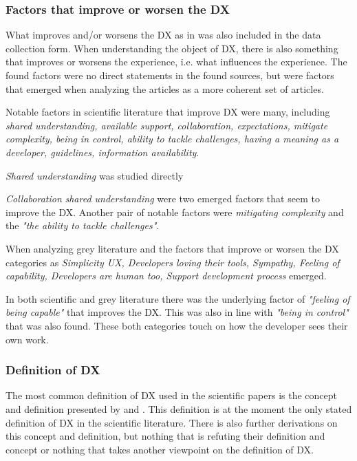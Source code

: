 \documentclass[english, 12pt, a4paper, sci, utf8, a-1b, online]{aaltothesis}
\newcounter{subsubsubsection}[subsubsection]
\begin{document}
\subsubsection{Factors that improve or worsen the DX}

What improves and/or worsens the DX as in \citet{fagerholm-doctoral-thesis} was also included in the data collection form. When understanding the object of DX, there is also something that improves or worsens the experience, i.e. what influences the experience. The found factors were no direct statements in the found sources, but were factors that emerged when analyzing the articles as a more coherent set of articles.


Notable factors in scientific literature that improve DX were many, including \textit{shared understanding,	available support, collaboration, expectations, mitigate complexity, being in control, ability to tackle challenges, having a meaning as a developer, guidelines, information availability}.

\textit{Shared understanding} was studied directly

\textit{Collaboration} \textit{shared understanding} were two emerged factors that seem to improve the DX. Another pair of notable factors were \textit{mitigating complexity} and the \textit{"the ability to tackle challenges"}.


When analyzing grey literature and the factors that improve or worsen the DX categories as \textit{Simplicity	UX, Developers loving their tools, Sympathy, Feeling of capability, Developers are human too, Support development process} emerged.

In both scientific and grey literature there was the underlying factor of \textit{"feeling of being capable"} that improves the DX. This was also in line with \textit{"being in control"} that was also found. These both categories touch on how the developer sees their own work.

\subsubsection{Definition of DX}

The most common definition of DX used in the scientific papers is the concept and definition presented by \cite{fagerholm-dx-concept-and-definition} and \cite{fagerholm-doctoral-thesis}. This definition is at the moment the only stated definition of DX in the scientific literature. There is also further derivations on this concept and definition, but nothing that is refuting their definition and concept or nothing that takes another viewpoint on the definition of DX.
\end{document}
